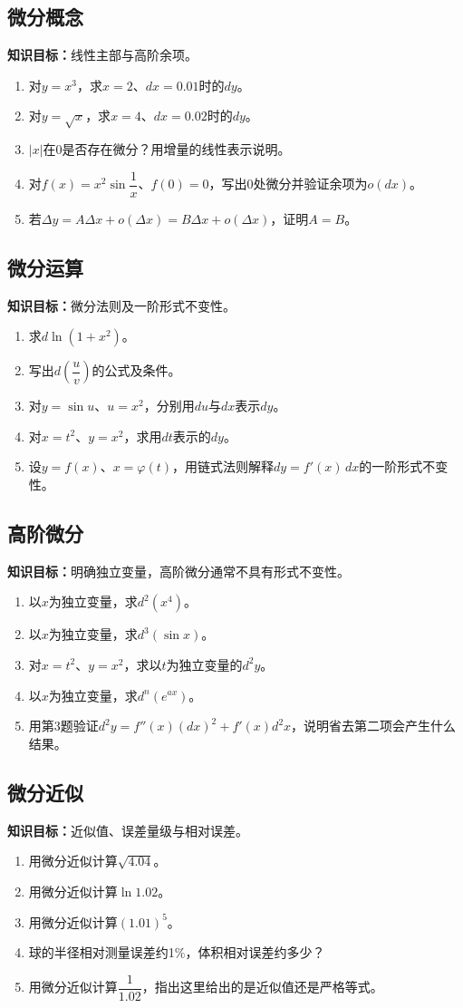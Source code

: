\documentclass[11pt,a4paper,fontset=fandol]{ctexrep}
\newcommand{\goal}[1]{\textbf{知识目标：}#1\par}
\begin{document}
\subsection{微分概念}
\goal{线性主部与高阶余项。}
\begin{enumerate}
\item 对$y=x^3$，求$x=2$、$dx=0.01$时的$dy$。
\item 对$y=\sqrt x$，求$x=4$、$dx=0.02$时的$dy$。
\item $|x|$在0是否存在微分？用增量的线性表示说明。
\item 对$f(x)=x^2\sin\dfrac{1}{x}$、$f(0)=0$，写出0处微分并验证余项为$o(dx)$。
\item 若$\Delta y=A\Delta x+o(\Delta x)=B\Delta x+o(\Delta x)$，证明$A=B$。
\end{enumerate}
\subsection{微分运算}
\goal{微分法则及一阶形式不变性。}
\begin{enumerate}
\item 求$d\ln(1+x^2)$。
\item 写出$d\left(\dfrac{u}{v}\right)$的公式及条件。
\item 对$y=\sin u$、$u=x^2$，分别用$du$与$dx$表示$dy$。
\item 对$x=t^2$、$y=x^2$，求用$dt$表示的$dy$。
\item 设$y=f(x)$、$x=\varphi(t)$，用链式法则解释$dy=f'(x)\,dx$的一阶形式不变性。
\end{enumerate}
\subsection{高阶微分}
\goal{明确独立变量，高阶微分通常不具有形式不变性。}
\begin{enumerate}
\item 以$x$为独立变量，求$d^2(x^4)$。
\item 以$x$为独立变量，求$d^3(\sin x)$。
\item 对$x=t^2$、$y=x^2$，求以$t$为独立变量的$d^2y$。
\item 以$x$为独立变量，求$d^n(e^{ax})$。
\item 用第3题验证$d^2y=f''(x)(dx)^2+f'(x)d^2x$，说明省去第二项会产生什么结果。
\end{enumerate}
\subsection{微分近似}
\goal{近似值、误差量级与相对误差。}
\begin{enumerate}
\item 用微分近似计算$\sqrt{4.04}$。
\item 用微分近似计算$\ln1.02$。
\item 用微分近似计算$(1.01)^5$。
\item 球的半径相对测量误差约1\%，体积相对误差约多少？
\item 用微分近似计算$\dfrac{1}{1.02}$，指出这里给出的是近似值还是严格等式。
\end{enumerate}
\end{document}
